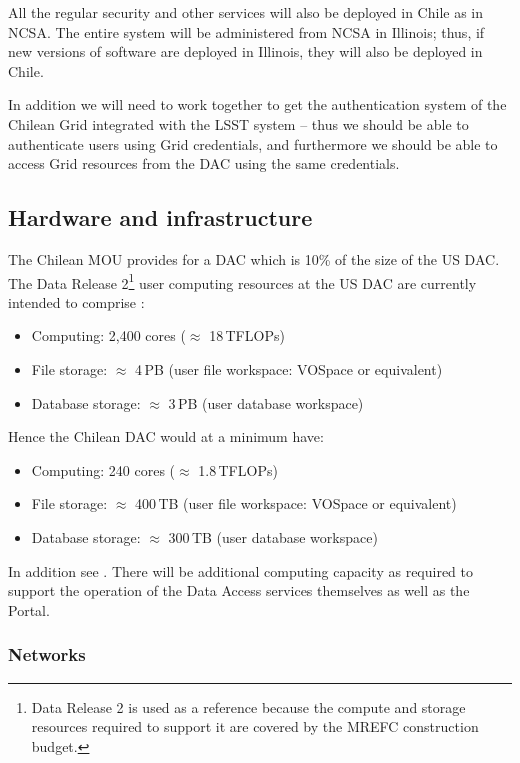 All the regular security and other services will also be deployed in Chile as in NCSA.
The entire system will be administered from NCSA in Illinois; thus, if new versions of software are deployed in Illinois, they will also be deployed in Chile.

In addition we will need to work together to get the authentication system of the Chilean Grid integrated with the LSST system  -- thus we should be able to authenticate users using Grid credentials, and furthermore we should be able to access Grid resources from the DAC using the same credentials.


\subsection{Hardware and infrastructure}\label{sec:hw}

The Chilean MOU provides for a DAC which is 10\% of the size of the US DAC.
The Data Release 2\footnote{Data Release 2 is used as a reference because the compute and storage resources required to support it are covered by the MREFC construction budget.} user computing resources at the US DAC are currently intended to comprise :
\begin{itemize}
\item Computing: 2,400 cores ($\approx$ 18\,TFLOPs)
\item File storage: $\approx$ 4\,PB  (user file workspace: VOSpace or equivalent)
\item Database storage: $\approx$ 3\,PB (user database workspace)

\end{itemize}

Hence the Chilean DAC would at a minimum have:
\begin{itemize}
\item Computing: 240 cores ($\approx$ 1.8\,TFLOPs)
\item File storage: $\approx$ 400\,TB  (user file workspace: VOSpace or equivalent)
\item Database storage: $\approx$ 300\,TB (user database workspace)

\end{itemize}

In addition see .
There will be additional computing capacity as required to support the operation of the Data Access services themselves as well as the Portal.


\subsubsection{Networks}

